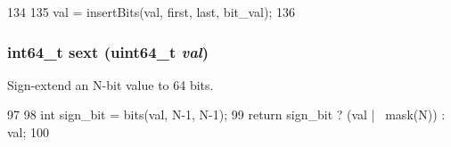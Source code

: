 \begin{DoxyCode}
134 {
135     val = insertBits(val, first, last, bit_val);
136 }
\end{DoxyCode}
\hypertarget{bitfield_8hh_af08692f68db7334df1b150e57ef92c9f}{
\subsubsection[{sext}]{\setlength{\rightskip}{0pt plus 5cm}int64\_\-t sext (uint64\_\-t {\em val})}}
\label{bitfield_8hh_af08692f68db7334df1b150e57ef92c9f}
Sign-\/extend an N-\/bit value to 64 bits. 


\begin{DoxyCode}
97 {
98     int sign_bit = bits(val, N-1, N-1);
99     return sign_bit ? (val | ~mask(N)) : val;
100 }
\end{DoxyCode}
